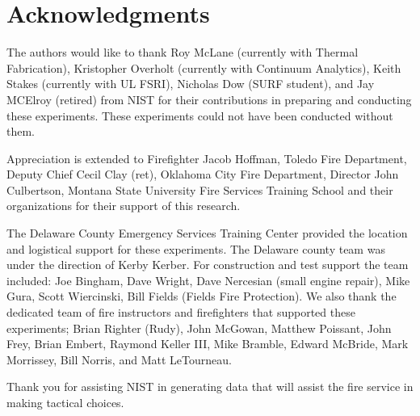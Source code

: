 \documentclass[12pt,oneside]{book}
\begin{document}
\chapter{Acknowledgments}

The authors would like to thank Roy McLane (currently with Thermal Fabrication), Kristopher Overholt (currently with Continuum Analytics), Keith Stakes (currently with UL FSRI), Nicholas Dow (SURF student), and Jay MCElroy (retired) from NIST for their contributions in preparing and conducting these experiments. These experiments could not have been conducted without them. 

Appreciation is extended to Firefighter Jacob Hoffman, Toledo Fire Department, Deputy Chief Cecil Clay (ret), Oklahoma City Fire Department, Director John Culbertson, Montana State University Fire Services Training School and their organizations for their support of this research.

The Delaware County Emergency Services Training Center provided the location and logistical support for these experiments.  The Delaware county team was under the direction of Kerby Kerber.  For construction and test support the team included: Joe Bingham, Dave Wright, Dave Nercesian (small engine repair), Mike Gura, Scott Wiercinski, Bill Fields (Fields Fire Protection).  We also thank the dedicated team of fire instructors and firefighters that supported these experiments; Brian Righter (Rudy), John McGowan, Matthew Poissant, John Frey, Brian Embert, Raymond Keller III, Mike Bramble, Edward McBride, Mark Morrissey, Bill Norris, and Matt LeTourneau.

Thank you for assisting NIST in generating data that will assist the fire service in making tactical choices.



 







\appendix
\end{document}
